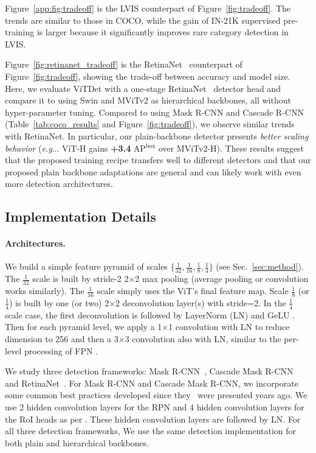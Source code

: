 \documentclass[runningheads]{llncs}
\makeatletter
\DeclareRobustCommand\onedot{\futurelet\@let@token\@onedot}
\def\@onedot{\ifx\@let@token.\else.\null\fi\xspace}
\def\eg{\emph{e.g}\onedot} \def\Eg{\emph{E.g}\onedot}
\newcommand{\boxAP}{AP$^\text{box}$\xspace}
\makeatother
\begin{document}
Figure~\ref{app:fig:tradeoff} is the LVIS counterpart of Figure~\ref{fig:tradeoff}. The trends are similar to those in COCO, while the gain of IN-21K supervised pre-training is larger because it significantly improves rare category detection in LVIS.

Figure~\ref{fig:retinanet_tradeoff} is the RetinaNet~\cite{Lin2017a} counterpart of Figure~\ref{fig:tradeoff}, showing the trade-off between accuracy and model size. Here, we evaluate ViTDet with a one-stage RetinaNet~\cite{Lin2017a} detector head and compare it to using Swin and MViTv2 as hierarchical backbones, all without hyper-parameter tuning. Compared to using Mask R-CNN and Cascade R-CNN (Table~\ref{tab:coco_results} and Figure~\ref{fig:tradeoff}), we observe similar trends with RetinaNet. In particular, our plain-backbone detector presents \emph{better scaling behavior} (\eg. ViT-H gains \textbf{+3.4} \boxAP over MViTv2-H). These results suggest that the proposed training recipe transfers well to different detectors and that our proposed plain backbone adaptations are general and can likely work with even more detection architectures. 

    
\subsection{Implementation Details} \label{app:sec:details}

\paragraph{Architectures.}
We build a simple feature pyramid of scales $\{\frac{1}{32}, \frac{1}{16}, \frac{1}{8}, \frac{1}{4}\}$ (see Sec.~\ref{sec:method}). The $\frac{1}{32}$ scale is built by stride-2 2$\times$2 max pooling (average pooling or convolution works similarly). The $\frac{1}{16}$ scale simply uses the ViT's final feature map. Scale $\frac{1}{8}$ (or $\frac{1}{4}$) is built by one (or two) 2$\times$2 deconvolution layer(s) with stride=2. In the $\frac{1}{4}$ scale case, the first deconvolution is followed by LayerNorm (LN)  and GeLU . Then for each pyramid level, we apply a 1$\times$1 convolution with LN to reduce dimension to 256 and then a 3$\times$3 convolution also with LN, similar to the per-level processing of FPN \cite{Lin2017}.

We study three detection frameworks: Mask R-CNN~\cite{He2017}, Cascade Mask R-CNN~\cite{Cai2019} and RetinaNet~\cite{Lin2017a}. For Mask R-CNN and Cascade Mask R-CNN, we incorporate some common best practices developed since they~\cite{He2017,Cai2019} were presented years ago. We use 2 hidden convolution layers for the RPN and 4 hidden convolution layers for the RoI heads as per . These hidden convolution layers are followed by LN. For all three detection frameworks, We use the same detection implementation for both plain and hierarchical backbones.
\end{document}
